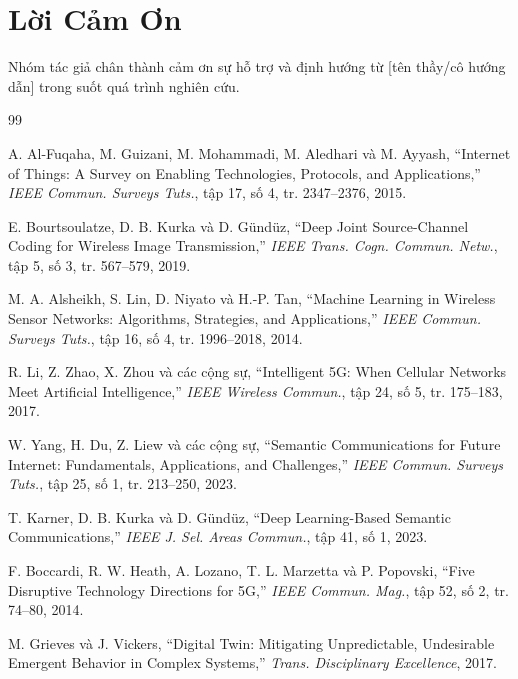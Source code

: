 \documentclass[conference]{IEEEtran}
\begin{document}
\section*{Lời Cảm Ơn}
Nhóm tác giả chân thành cảm ơn sự hỗ trợ và định hướng từ
[tên thầy/cô hướng dẫn] trong suốt quá trình nghiên cứu.

\begin{thebibliography}{99}

A. Al-Fuqaha, M. Guizani, M. Mohammadi, M. Aledhari và
M. Ayyash, ``Internet of Things: A Survey on Enabling
Technologies, Protocols, and Applications,''
\textit{IEEE Commun. Surveys Tuts.}, tập 17, số 4,
tr. 2347--2376, 2015.

E. Bourtsoulatze, D. B. Kurka và D. Gündüz,
``Deep Joint Source-Channel Coding for Wireless Image
Transmission,'' \textit{IEEE Trans. Cogn. Commun. Netw.},
tập 5, số 3, tr. 567--579, 2019.

M. A. Alsheikh, S. Lin, D. Niyato và H.-P. Tan,
``Machine Learning in Wireless Sensor Networks:
Algorithms, Strategies, and Applications,''
\textit{IEEE Commun. Surveys Tuts.}, tập 16, số 4,
tr. 1996--2018, 2014.

R. Li, Z. Zhao, X. Zhou và các cộng sự,
``Intelligent 5G: When Cellular Networks Meet
Artificial Intelligence,'' \textit{IEEE Wireless Commun.},
tập 24, số 5, tr. 175--183, 2017.

W. Yang, H. Du, Z. Liew và các cộng sự,
``Semantic Communications for Future Internet: Fundamentals,
Applications, and Challenges,''
\textit{IEEE Commun. Surveys Tuts.},
tập 25, số 1, tr. 213--250, 2023.

T. Karner, D. B. Kurka và D. Gündüz,
``Deep Learning-Based Semantic Communications,''
\textit{IEEE J. Sel. Areas Commun.}, tập 41, số 1, 2023.

F. Boccardi, R. W. Heath, A. Lozano, T. L. Marzetta và
P. Popovski, ``Five Disruptive Technology Directions for 5G,''
\textit{IEEE Commun. Mag.}, tập 52, số 2, tr. 74--80, 2014.

M. Grieves và J. Vickers, ``Digital Twin: Mitigating
Unpredictable, Undesirable Emergent Behavior in Complex
Systems,'' \textit{Trans. Disciplinary Excellence}, 2017.


\end{thebibliography}
\end{document}
